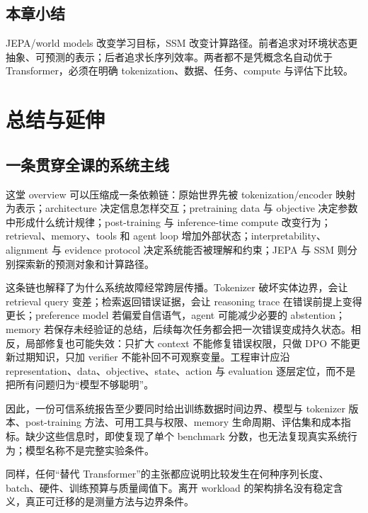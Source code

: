 \documentclass[a4paper]{article}
\begin{document}
\subsection{本章小结}

JEPA/world models 改变学习目标，SSM 改变计算路径。前者追求对环境状态更抽象、可预测的表示；后者追求长序列效率。两者都不是凭概念名自动优于 Transformer，必须在明确 tokenization、数据、任务、compute 与评估下比较。

\section{总结与延伸}

\subsection{一条贯穿全课的系统主线}

这堂 overview 可以压缩成一条依赖链：原始世界先被 tokenization/encoder 映射为表示；architecture 决定信息怎样交互；pretraining data 与 objective 决定参数中形成什么统计规律；post-training 与 inference-time compute 改变行为；retrieval、memory、tools 和 agent loop 增加外部状态；interpretability、alignment 与 evidence protocol 决定系统能否被理解和约束；JEPA 与 SSM 则分别探索新的预测对象和计算路径。

这条链也解释了为什么系统故障经常跨层传播。Tokenizer 破坏实体边界，会让 retrieval query 变差；检索返回错误证据，会让 reasoning trace 在错误前提上变得更长；preference model 若偏爱自信语气，agent 可能减少必要的 abstention；memory 若保存未经验证的总结，后续每次任务都会把一次错误变成持久状态。相反，局部修复也可能失效：只扩大 context 不能修复错误权限，只做 DPO 不能更新过期知识，只加 verifier 不能补回不可观察变量。工程审计应沿 representation、data、objective、state、action 与 evaluation 逐层定位，而不是把所有问题归为“模型不够聪明”。

因此，一份可信系统报告至少要同时给出训练数据时间边界、模型与 tokenizer 版本、post-training 方法、可用工具与权限、memory 生命周期、评估集和成本指标。缺少这些信息时，即使复现了单个 benchmark 分数，也无法复现真实系统行为；模型名称不是完整实验条件。

同样，任何“替代 Transformer”的主张都应说明比较发生在何种序列长度、batch、硬件、训练预算与质量阈值下。离开 workload 的架构排名没有稳定含义，真正可迁移的是测量方法与边界条件。
\end{document}
